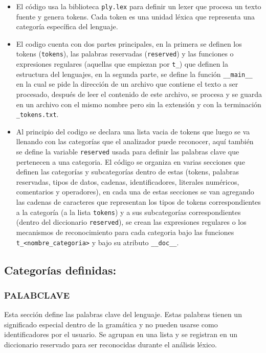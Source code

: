 \documentclass{article}
\begin{document}
\begin{itemize}
  \item El código usa la biblioteca \texttt{ply.lex} para definir un lexer que procesa un texto fuente y genera tokens. Cada token es una unidad léxica que representa una categoría específica del lenguaje.
  \item El codigo cuenta con dos partes principales, en la primera se definen los tokens (\texttt{tokens}), las palabras reservadas (\texttt{reserved}) y las funciones o expresiones regulares (aquellas que empiezan por \texttt{t\_}) que definen la estructura del lenguajes, en la segunda parte, se define la función \texttt{\_\_main\_\_} en la cual se pide la dirección de un archivo que contiene el texto a ser procesado, después de leer el contenido de este archivo, se procesa y se guarda en un archivo con el mismo nombre pero sin la extensión y con la terminación \texttt{\_tokens.txt}.
  \item Al principio del codigo se declara una lista vacia de tokens que luego se va llenando con las categorías que el analizador puede reconocer, aquí también se define la variable \texttt{reserved} usada para definir las palabras clave que pertenecen a una categoria. El código se organiza en varias secciones que definen las categorías y subcategorías dentro de estas (tokens, palabras reservadas, tipos de datos, cadenas, identificadores, literales numéricos, comentarios y operadores), en cada una de estas secciones se van agregando las cadenas de caracteres que representan los tipos de tokens correspondientes a la categoría (a la lista \texttt{tokens}) y a sus subcategorías correspondientes (dentro del diccionario \texttt{reserved}), se crean las expresiones regulares o los mecanismos de reconocimiento para cada categoria bajo las funciones \texttt{t\_<nombre\_categoria>} y bajo su atributo \texttt{\_\_doc\_\_}.
\end{itemize}

\subsection{Categorías definidas:}

\subsubsection{PALABCLAVE}

Esta sección define las palabras clave del lenguaje. Estas palabras tienen un significado especial dentro de la gramática y no pueden usarse como identificadores por el usuario. Se agrupan en una lista y se registran en un diccionario reservado para ser reconocidas durante el análisis léxico.
\end{document}
